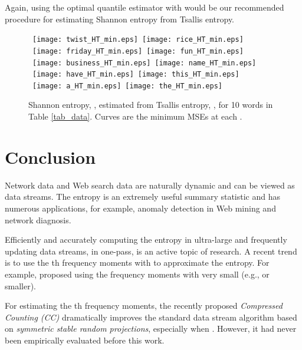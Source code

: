\documentclass{sig-alternate}
\begin{document}
Again, using the optimal quantile estimator with  would be our recommended procedure for estimating Shannon entropy from Tsallis entropy.


\begin{figure}[h]
\begin{center}\mbox{
{\texttt{[image: twist\_HT\_min.eps]}} \hspace{-0.1in}
{\texttt{[image: rice\_HT\_min.eps]}}}
\mbox{
{\texttt{[image: friday\_HT\_min.eps]}} \hspace{-0.1in}
{\texttt{[image: fun\_HT\_min.eps]}}
}\\
\mbox{
{\texttt{[image: business\_HT\_min.eps]}} \hspace{-0.1in}
{\texttt{[image: name\_HT\_min.eps]}}}
\mbox{
{\texttt{[image: have\_HT\_min.eps]}} \hspace{-0.1in}
{\texttt{[image: this\_HT\_min.eps]}}
}
\mbox{
{\texttt{[image: a\_HT\_min.eps]}} \hspace{-0.1in}
{\texttt{[image: the\_HT\_min.eps]}}
}
\end{center}
\vspace{-0.15in}
\caption{Shannon entropy, , estimated from Tsallis entropy, , for 10 words in Table \ref{tab_data}. Curves are the minimum MSEs at each . }\label{fig_HT_min}
\end{figure}
\clearpage
\section{Conclusion}\label{sec_conclusion}

Network data and Web search data are naturally dynamic and can be viewed as data streams. The entropy is an extremely useful summary statistic and has numerous applications, for example, anomaly detection in Web mining and network diagnosis.

Efficiently and accurately computing the entropy in ultra-large and frequently updating data streams, in one-pass, is an active topic of research. A recent trend is to use the th frequency moments with  to approximate the entropy. For example, \cite{Article:Harvey_entropy_arXiv08,Proc:Harvey_FOCS08} proposed using the  frequency moments with very small  (e.g.,  or smaller).

For estimating the th frequency moments, the recently proposed {\em Compressed Counting (CC)} dramatically improves the standard data stream algorithm based on {\em symmetric stable random projections}, especially when . However, it had never been empirically evaluated before this work.
\end{document}
